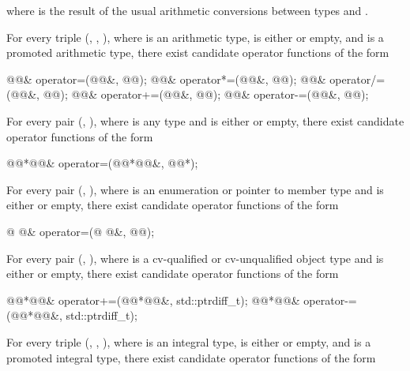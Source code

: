 where
is the result of the usual arithmetic conversions between types
and
.

\pnum
For every triple
(,
,
),
where
is an arithmetic type,
is either
or empty,
and
is a promoted arithmetic type,
there exist candidate operator functions of the form

\begin{codeblock}
@@&   operator=(@@&, @@);
@@&   operator*=(@@&, @@);
@@&   operator/=(@@&, @@);
@@&   operator+=(@@&, @@);
@@&   operator-=(@@&, @@);
\end{codeblock}

\pnum
For every pair (, ), where  is any type and  is either
 or empty, there exist candidate operator functions of the form

\begin{codeblock}
@@*@@&   operator=(@@*@@&, @@*);
\end{codeblock}

\pnum
For every pair
(,
),
where
is an enumeration or pointer to member type and
is either
or empty,
there exist candidate operator functions of the form

\begin{codeblock}
@ @&   operator=(@ @&, @@);
\end{codeblock}

\pnum
For every pair
(,
),
where
is a cv-qualified or cv-unqualified object type and
is either
or empty,
there exist candidate operator functions of the form

\begin{codeblock}
@@*@@&   operator+=(@@*@@&, std::ptrdiff_t);
@@*@@&   operator-=(@@*@@&, std::ptrdiff_t);
\end{codeblock}

\pnum
For every triple
(,
,
),
where
is an integral type,
is either
or empty,
and
is a promoted integral type,
there exist candidate operator functions of the form

